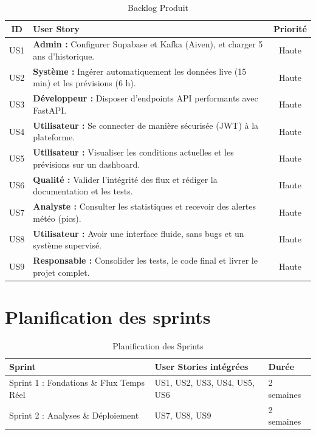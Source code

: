 \begin{table}[H]
\centering
\caption{Backlog Produit}
\label{tab:backlog}
\begin{tabularx}{\textwidth}{|c|X|c|}
\hline
\textbf{ID} & \textbf{User Story} & \textbf{Priorité} \\
\hline
US1 & \textbf{Admin :} Configurer Supabase et Kafka (Aiven), et charger 5 ans d'historique. & Haute \\
\hline
US2 & \textbf{Système :} Ingérer automatiquement les données live (15 min) et les prévisions (6 h). & Haute \\
\hline
US3 & \textbf{Développeur :} Disposer d'endpoints API performants avec FastAPI. & Haute \\
\hline
US4 & \textbf{Utilisateur :} Se connecter de manière sécurisée (JWT) à la plateforme. & Haute \\
\hline
US5 & \textbf{Utilisateur :} Visualiser les conditions actuelles et les prévisions sur un dashboard. & Haute \\
\hline
US6 & \textbf{Qualité :} Valider l'intégrité des flux et rédiger la documentation et les tests. & Haute \\
\hline
US7 & \textbf{Analyste :} Consulter les statistiques et recevoir des alertes météo (pics). & Haute \\
\hline
US8 & \textbf{Utilisateur :} Avoir une interface fluide, sans bugs et un système supervisé. & Haute \\
\hline
US9 & \textbf{Responsable :} Consolider les tests, le code final et livrer le projet complet. & Haute \\
\hline
\end{tabularx}
\end{table}

\section{Planification des sprints}
\begin{table}[H]
\centering
\caption{Planification des Sprints}
\label{tab:sprints}
\begin{tabularx}{\textwidth}{|l|X|l|}
\hline
\textbf{Sprint} & \textbf{User Stories intégrées} & \textbf{Durée} \\
\hline
Sprint 1 : Fondations \& Flux Temps Réel & US1, US2, US3, US4, US5, US6 & 2 semaines \\
\hline
Sprint 2 : Analyses \& Déploiement & US7, US8, US9 & 2 semaines \\
\hline
\end{tabularx}
\end{table}
